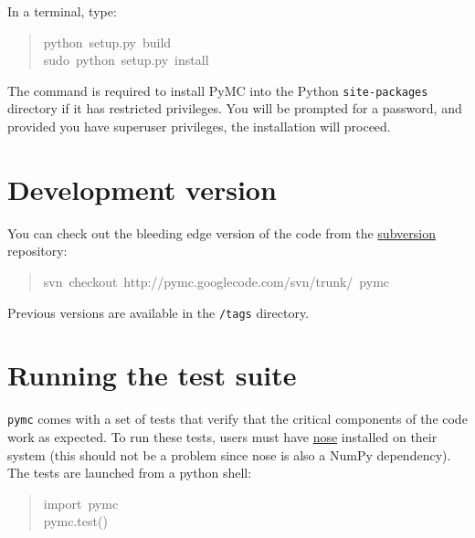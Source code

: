 In a terminal, type:
\begin{quote}{\ttfamily \raggedright \noindent
python~setup.py~build~\\
sudo~python~setup.py~install
}\end{quote}

The  command is required to install PyMC into the Python \texttt{site-packages}
directory if it has restricted privileges. You will be prompted for a password,
and provided you have superuser privileges, the installation will proceed.



\hypertarget{development-version}{}
\section*{Development version}
\label{development-version}

You can check out the bleeding edge version of the code from the \href{http://subversion.tigris.org/}{subversion}
repository:
\begin{quote}{\ttfamily \raggedright \noindent
svn~checkout~http://pymc.googlecode.com/svn/trunk/~pymc
}\end{quote}

Previous versions are available in the \texttt{/tags} directory.



\hypertarget{running-the-test-suite}{}
\section*{Running the test suite}
\label{running-the-test-suite}

\texttt{pymc} comes with a set of tests that verify that the critical components
of the code work as expected. To run these tests, users must have \href{http://somethingaboutorange.com/mrl/projects/nose/}{nose}
installed on their system (this should not be a problem since nose is also
a NumPy dependency). The tests are launched from a python shell:
\begin{quote}{\ttfamily \raggedright \noindent
import~pymc~\\
pymc.test()
}\end{quote}

